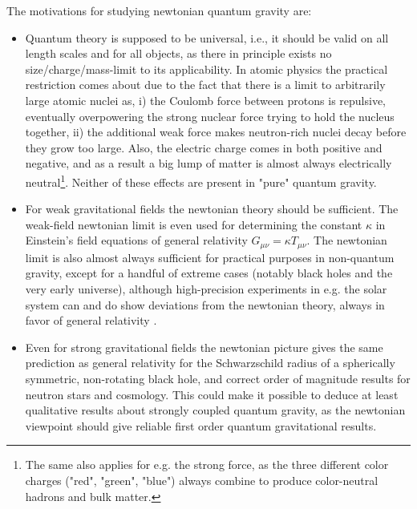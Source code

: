 	The motivations for studying newtonian quantum gravity are:
	\begin{itemize}
		\item Quantum theory is supposed to be universal, i.e., it should be valid on all length scales and for all objects, as there in principle exists no size/charge/mass-limit to its applicability. In atomic physics the practical restriction comes about due to the	fact that there is a limit to arbitrarily large atomic nuclei as, i) the Coulomb force between protons is repulsive, eventually overpowering the strong nuclear force trying to hold the nucleus together, ii) the additional weak force makes neutron-rich nuclei decay before they grow too large. Also, the electric charge comes in both positive and negative, and as a result a big lump of matter is almost always electrically neutral\footnote{The same also applies for e.g. the strong force, as the three different color charges ("red", "green", "blue") always combine to produce color-neutral hadrons and bulk matter.}. Neither of these effects are present in "pure" quantum gravity.
	
		\item  For weak gravitational fields the newtonian theory should be sufficient. The weak-field newtonian limit is even used for determining the constant $\kappa$ in Einstein's field equations of general relativity $G_{\mu \nu} = \kappa T_{\mu \nu}$. The newtonian limit is also almost always sufficient for practical purposes in non-quantum gravity, except for a handful of extreme cases (notably black holes and the very early universe), although high-precision experiments in e.g. the solar system can and do show deviations from the newtonian theory, always in favor of general relativity \cite{Will}.
	
		\item  Even for strong gravitational fields the newtonian picture gives the same prediction as general relativity for the Schwarzschild radius of a spherically symmetric, non-rotating black hole, and correct order of magnitude results for neutron stars and cosmology. This could make it possible to deduce at least qualitative results about strongly coupled quantum gravity, as the newtonian viewpoint should give reliable first order quantum gravitational results.
	\end{itemize}
	

